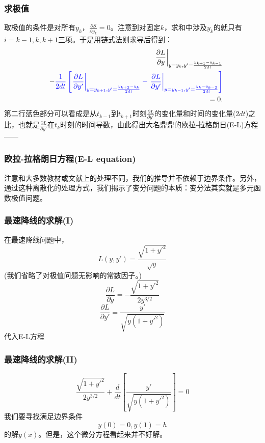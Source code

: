 \documentclass[CJK]{beamer}
\begin{document}
\begin{frame}
  \frametitle{求极值}
  取极值的条件是对所有$y_k$，$\frac{\partial S}{\partial y_k} = 0$。注意到对固定$k$，求和中涉及$y_k$的就只有$i=k-1,k,k+1$三项。于是用链式法则求导后得到：
  \begin{eqnarray}
    && \left. \frac{\partial L}{\partial y}\right\vert_{y=y_k, y'=\frac{y_{k+1}-y_{k-1}}{2 dt}} \nonumber \\
  && - {\color{blue} \frac{1}{2dt}\left[\left.\frac{\partial L}{\partial y'}\right\vert_{y=y_{k+1},y'=\frac{y_{k+2}-y_k}{2dt}} - \left.\frac{\partial L}{\partial y'}\right\vert_{y=y_{k-1},y'=\frac{y_k-y_{k-2}}{2dt}}
     \right]} \nonumber \\
    &&  = 0. \nonumber
  \end{eqnarray}
  第二行蓝色部分可以看成是从$t_{k-1}$到$t_{k+1}$时刻$\frac{\partial L}{\partial y'}$的变化量和时间的变化量($2dt$)之比，也就是$\frac{\partial L}{\partial y'}$在$t_k$时刻的时间导数，由此得出大名鼎鼎的{\blue 欧拉-拉格朗日(E-L)方程}——
\end{frame}

\begin{frame}
\frametitle{欧拉-拉格朗日方程(E-L equation)}

注意和大多数教材或文献上的处理不同，我们的推导并不依赖于边界条件。另外，通过这种离散化的处理方式，我们揭示了变分问题的本质：变分法其实就是多元函数极值问题。
\end{frame}


\begin{frame}
  \frametitle{最速降线的求解(I)}
  在最速降线问题中，
  $$L(y,y') = \frac{\sqrt{1+y'^2}}{\sqrt{y}} $$
  (我们省略了对极值问题无影响的常数因子。)
  $$\frac{\partial L}{\partial y} = -\frac{\sqrt{1+y'^2}}{2y^{3/2}}$$
  $$\frac{\partial L}{\partial y'} = \frac{y'}{\sqrt{y(1+y'^2)}}$$    
  代入E-L方程
\end{frame}


\begin{frame}
  \frametitle{最速降线的求解(II)}
  $$\frac{\sqrt{1+y'^2}}{2y^{3/2}}+ \frac{d}{dt}\left[ \frac{y'}{\sqrt{y(1+y'^2)}}\right]=0$$
  我们要寻找满足边界条件
  $$ y(0)=0, y(1)=h$$
  的解$y(x)$。但是，这个微分方程看起来并不好解。
\end{frame}


\end{document}
